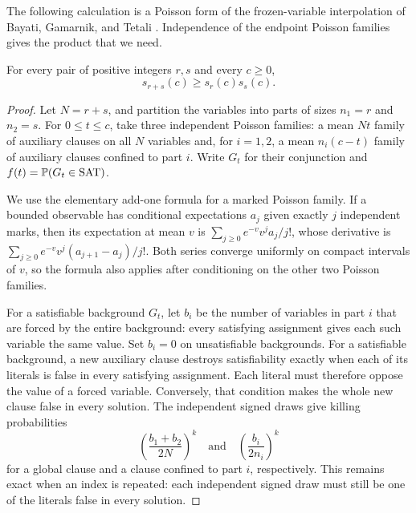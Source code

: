 The following calculation is a Poisson form of the frozen-variable
interpolation of Bayati, Gamarnik, and Tetali
\cite[Section~4, Proposition~2]{BGT}.  Independence of the endpoint
Poisson families gives the product that we need.

\begin{lemma}\label{lem:auxiliary-product}
For every pair of positive integers \(r,s\) and every \(c\ge0\),
\begin{equation}\label{eq:auxiliary-product}
 s_{r+s}(c)\ge s_r(c)s_s(c).
\end{equation}
\end{lemma}

\begin{proof}
Let \(N=r+s\), and partition the variables into parts of sizes
\(n_1=r\) and \(n_2=s\).  For \(0\le t\le c\), take three independent
Poisson families: a mean \(Nt\) family of auxiliary clauses on all
\(N\) variables and, for \(i=1,2\), a mean \(n_i(c-t)\) family of
auxiliary clauses confined to part \(i\).  Write \(G_t\) for their
conjunction and \(f(t)=\mathbb P(G_t\in\mathrm{SAT})\).

We use the elementary add-one formula for a marked Poisson family.
If a bounded observable has conditional expectations \(a_j\) given
exactly \(j\) independent marks, then its expectation at mean \(v\) is
\(\sum_{j\ge0}e^{-v}v^ja_j/j!\), whose derivative is
\(\sum_{j\ge0}e^{-v}v^j(a_{j+1}-a_j)/j!\).  Both series converge
uniformly on compact intervals of \(v\), so the formula also applies
after conditioning on the other two Poisson families.

For a satisfiable background \(G_t\), let \(b_i\) be the number of
variables in part \(i\) that are forced by the entire background: every
satisfying assignment gives each such variable the same value.  Set
\(b_i=0\) on unsatisfiable backgrounds.  For a satisfiable background,
a new auxiliary clause destroys satisfiability exactly when each of its literals
is false in every satisfying assignment.  Each literal must therefore
oppose the value of a forced variable.  Conversely, that condition makes
the whole new clause false in every solution.  The independent signed
draws give killing probabilities
\[
 \left(\frac{b_1+b_2}{2N}\right)^k
 \quad\text{and}\quad
 \left(\frac{b_i}{2n_i}\right)^k
\]
for a global clause and a clause confined to part \(i\), respectively.
This remains exact when an index is repeated: each independent signed
draw must still be one of the literals false in every solution.


\end{proof}
